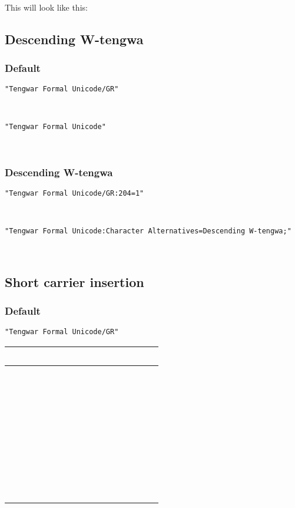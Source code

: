 \documentclass[11pt,a4paper]{article}
\begin{document}
\paragraph{} This will look like this: \myformal   \normalfont


\subsection{Descending W-tengwa}

\subsubsection{Default}

\noindent \texttt{"Tengwar Formal Unicode/GR"}

\formalGR  

\noindent \texttt{"Tengwar Formal Unicode"}

\formalAAT  

\subsubsection{Descending W-tengwa}

\texttt{"Tengwar Formal Unicode/GR:204=1"}

\formalGRdescw  

\noindent \texttt{"Tengwar Formal Unicode:Character Alternatives=Descending W-tengwa;"}

\formalAATdescw  


\subsection{Short carrier insertion}

\subsubsection{Default}

\noindent \texttt{"Tengwar Formal Unicode/GR"}

\newcommand{\combinationsrow}[1]{#1 & #1 & #1 & #1 & #1 & #1 & #1 & #1 & #1 \\}

\formalGR
\begin{tabular}{ c | c c c c c c c c}
	\combinationsrow{} \hline
	\combinationsrow{}
	\combinationsrow{}
	\combinationsrow{}
	\combinationsrow{}
	\combinationsrow{}
	\combinationsrow{}
	\combinationsrow{}
	\combinationsrow{}
\end{tabular}
\end{document}
